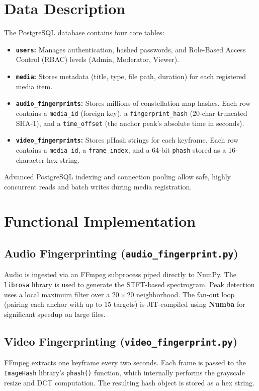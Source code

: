 \section{Data Description}
The PostgreSQL database contains four core tables:

\begin{itemize}
  \item \textbf{\texttt{users}:} Manages authentication, hashed passwords, and Role-Based Access Control (RBAC) levels (Admin, Moderator, Viewer).
  \item \textbf{\texttt{media}:} Stores metadata (title, type, file path, duration) for each registered media item.
  \item \textbf{\texttt{audio\_fingerprints}:} Stores millions of constellation map hashes. Each row contains a \texttt{media\_id} (foreign key), a \texttt{fingerprint\_hash} (20-char truncated SHA-1), and a \texttt{time\_offset} (the anchor peak's absolute time in seconds).
  \item \textbf{\texttt{video\_fingerprints}:} Stores pHash strings for each keyframe. Each row contains a \texttt{media\_id}, a \texttt{frame\_index}, and a 64-bit \texttt{phash} stored as a 16-character hex string.
\end{itemize}

Advanced PostgreSQL indexing and connection pooling allow safe, highly concurrent reads and batch writes during media registration.

\section{Functional Implementation}

\subsection*{Audio Fingerprinting (\texttt{audio\_fingerprint.py})}
Audio is ingested via an FFmpeg subprocess piped directly to NumPy. The \texttt{librosa} library is used to generate the STFT-based spectrogram. Peak detection uses a local maximum filter over a $20 \times 20$ neighborhood. The fan-out loop (pairing each anchor with up to 15 targets) is JIT-compiled using \textbf{Numba} for significant speedup on large files.

\subsection*{Video Fingerprinting (\texttt{video\_fingerprint.py})}
FFmpeg extracts one keyframe every two seconds. Each frame is passed to the \texttt{ImageHash} library's \texttt{phash()} function, which internally performs the grayscale resize and DCT computation. The resulting hash object is stored as a hex string.

